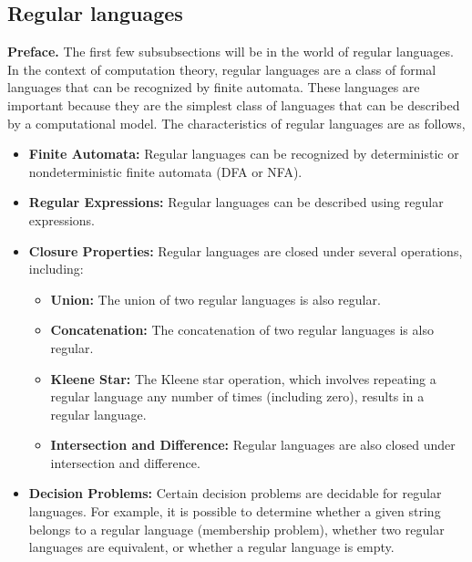 \documentclass{report}
\begin{document}
    \subsection{Regular languages}
    \bigbreak \noindent 
    \textbf{Preface.} The first few subsubsections will be in the world of regular languages. In the context of computation theory, regular languages are a class of formal languages that can be recognized by finite automata. These languages are important because they are the simplest class of languages that can be described by a computational model. The characteristics of regular languages are as follows,
    \begin{itemize}
        \item \textbf{Finite Automata:} Regular languages can be recognized by deterministic or nondeterministic finite automata (DFA or NFA).
        \item \textbf{Regular Expressions:} Regular languages can be described using regular expressions.
        \item \textbf{Closure Properties:} Regular languages are closed under several operations, including:
            \begin{itemize}
                \item \textbf{Union:} The union of two regular languages is also regular.
                \item \textbf{Concatenation:} The concatenation of two regular languages is also regular.
                \item \textbf{Kleene Star:} The Kleene star operation, which involves repeating a regular language any number of times (including zero), results in a regular language.
                \item \textbf{Intersection and Difference:} Regular languages are also closed under intersection and difference.
            \end{itemize}
        \item \textbf{Decision Problems:} Certain decision problems are decidable for regular languages. For example, it is possible to determine whether a given string belongs to a regular language (membership problem), whether two regular languages are equivalent, or whether a regular language is empty.
    \end{itemize}
    \bigbreak \noindent 
\end{document}
